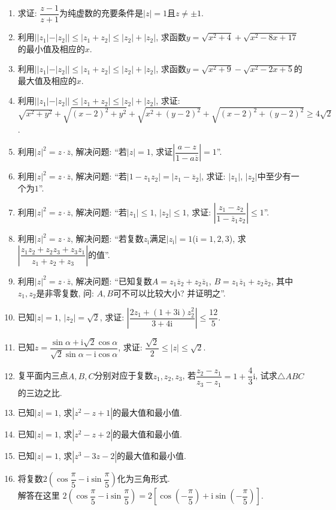 \documentclass[10pt,a4paper]{article}
\begin{document}
\begin{enumerate}[1.]
\item 求证: $\dfrac{z-1}{z+1}$为纯虚数的充要条件是$|z|=1$且$z\ne \pm 1$.
\item 利用$||z_1|-|z_2||\le|z_1+z_2|\le|z_2|+|z_2|$, 求函数$y=\sqrt {x^2+4}+\sqrt {x^2-8x+17}$的最小值及相应的$x$.
\item 利用$||z_1|-|z_2||\le|z_1+z_2|\le|z_2|+|z_2|$, 求函数$y=\sqrt {x^2+9}-\sqrt {x^2-2x+5}$的最大值及相应的$x$.
\item 利用$||z_1|-|z_2||\le|z_1+z_2|\le|z_2|+|z_2|$, 求证: $\sqrt {x^2+y^2}+\sqrt {(x-2)^2+y^2}+\sqrt {x^2+(y-2)^2}+\sqrt {(x-2)^2+(y-2)^2}\ge 4\sqrt 2$.
\item 利用$|z|^2=z\cdot \overline z$, 解决问题: ``若$|z|=1$, 求证$|\dfrac{a-z}{1-a\overline z}|=1$''.
\item 利用$|z|^2=z\cdot \overline z$, 解决问题: ``若$|1-z_1z_2|=|z_1-\overline z_2|$, 求证: $|z_1|$, $|z_2|$中至少有一个为$1$''.
\item 利用$|z|^2=z\cdot \overline z$, 解决问题: ``若$|z_1|\le 1$, $|z_2|\le 1$, 求证: $|\dfrac{{z_1}-{z_2}}{1-{{\overline z}_1}{z_2}}|\le 1$''.
\item 利用$|z|^2=z\cdot \overline z$, 解决问题: ``若复数$z_{\mathrm{i}}$满足$|z_{\mathrm{i}}|=1$($\mathrm{i}=1,2,3$), 求$|\dfrac{{z_1}{z_2}+{z_2}{z_3}+{z_3}{z_1}}{{z_1}+{z_2}+{z_3}}|$的值''.
\item 利用$|z|^2=z\cdot \overline z$, 解决问题: ``已知复数$A=z_1\overline z_2+z_2\overline z_1$, $B=z_1\overline z_1+z_2\overline z_2$, 其中$z_1,z_2$是非零复数, 问: $A,B$可不可以比较大小? 并证明之''.
\item 已知$|z|=1$, $|z_2|=\sqrt 2$, 求证: $|\dfrac{2z_1+(1+3\mathrm{i})z_2^2}{3+4\mathrm{i}}|\le \dfrac{12}5$.
\item 已知$z=\dfrac{\sin \alpha +\mathrm{i}\sqrt 2\cos \alpha }{\sqrt 2\sin \alpha -\mathrm{i}\cos \alpha }$, 求证: $\dfrac{\sqrt 2}2\le|z|\le \sqrt 2$.
\item 复平面内三点$A,B,C$分别对应于复数$z_1,z_2,z_3$, 若$\dfrac{z_2-z_1}{z_3-z_1}=1+\dfrac 43\mathrm{i}$, 试求$\triangle ABC$的三边之比.
\item 已知$|z|=1$, 求$|z^2-z+1|$的最大值和最小值.
\item 已知$|z|=1$, 求$|z^2-z+2|$的最大值和最小值.
\item 已知$|z|=1$, 求$|z^3-3z-2|$的最大值和最小值.
\item 将复数$2(\cos \dfrac{\pi }5-\mathrm{i}\sin \dfrac{\pi }5)$化为三角形式.\\
解答在这里 	$2(\cos \dfrac{\pi }5-\mathrm{i}\sin \dfrac{\pi }5)=2[\cos (-\dfrac{\pi }5)+\mathrm{i}\sin (-\dfrac{\pi }5)]$.

\end{enumerate}
\end{document}
